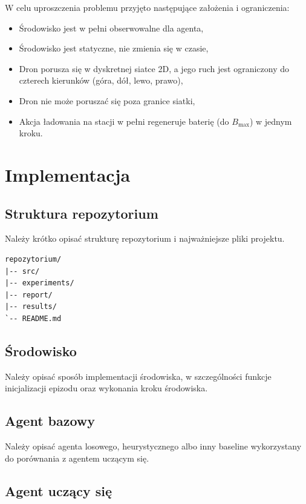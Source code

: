 \documentclass[12pt]{article}
\begin{document}
W celu uproszczenia problemu przyjęto następujące założenia i ograniczenia:
\begin{itemize}
    \item Środowisko jest w pełni obserwowalne dla agenta,
    \item Środowisko jest statyczne, nie zmienia się w czasie,
    \item Dron porusza się w dyskretnej siatce 2D, a jego ruch jest ograniczony do czterech kierunków (góra, dół, lewo, prawo),
    \item Dron nie może poruszać się poza granice siatki,
\item Akcja ładowania na stacji w pełni regeneruje baterię (do $B_{\max}$) w jednym kroku.

\end{itemize}
\section{Implementacja}

\subsection{Struktura repozytorium}

Należy krótko opisać strukturę repozytorium i najważniejsze pliki projektu.

\begin{verbatim}
repozytorium/
|-- src/
|-- experiments/
|-- report/
|-- results/
`-- README.md
\end{verbatim}

\subsection{Środowisko}

Należy opisać sposób implementacji środowiska, w szczególności funkcje inicjalizacji epizodu oraz wykonania kroku środowiska.

\subsection{Agent bazowy}

Należy opisać agenta losowego, heurystycznego albo inny baseline wykorzystany do porównania z agentem uczącym się.

\subsection{Agent uczący się}
\end{document}

